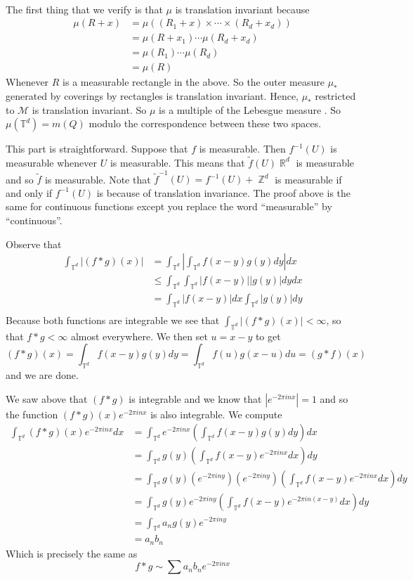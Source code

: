 \documentclass{article}
\DeclareMathOperator{\Z}{\mathbb{Z}}
\DeclareMathOperator{\R}{\mathbb{R}}
\newcommand{\problem}[1]{\noindent{\textbf{Problem #1}}\\}
\newcommand{\problempart}[1]{\noindent{\textbf{(#1)}}}
\begin{document}
\problem{6.7.16}
\problempart{a} The first thing that we verify is that $\mu$ is translation invariant because
\begin{align*}
\mu(R + x) &= \mu((R_1 + x) \times \cdots \times (R_d + x_d)) \\
&= \mu(R+x_1)\cdots\mu(R_d + x_d) \\
&= \mu(R_1)\cdots\mu(R_d) \\
&= \mu(R)
\end{align*}
Whenever $R$ is a measurable rectangle in the above. So the outer measure $\mu_*$ generated by coverings by rectangles is translation invariant. Hence, $\mu_*$ restricted to $\mathcal{M}$ is translation invariant. So $\mu$ is a multiple of the Lebesgue measure . So $\mu(\mathbb{T}^d) = m(Q)$ modulo the correspondence between these two spaces. 

\problempart{b} This part is straightforward. Suppose that $f$ is measurable. Then $f^{-1}(U)$ is measurable whenever $U$ is measurable. This means that $\tilde{f}(U) \R^d$ is measurable and so $\tilde{f}$ is measurable. Note that $\tilde{f}^{-1}(U) = f^{-1}(U) + \Z^d$ is measurable if and only if $f^{-1}(U)$ is because of translation invariance. The proof above is the same for continuous functions except you replace the word ``measurable'' by ``continuous''.  

\problempart{c} Observe that
\begin{align*}
\int_{\mathbb{T}^d} |(f * g)(x)| &= \int_{\mathbb{T}^d}\left|\int_{\mathbb{T}^d} f(x-y)g(y)dy\right|dx \\
&\leq \int_{\mathbb{T}^d}\int_{\mathbb{T}^d}|f(x-y)||g(y)|dydx \\ 
&= \int_{\mathbb{T}^d}|f(x-y)|dx\int_{\mathbb{T}^d}|g(y)|dy \\
\end{align*}
Because both functions are integrable we see that $\int_{\mathbb{T}^d} |(f * g)(x)| < \infty$, so that $f * g < \infty$ almost everywhere. We then set $u = x-y$ to get
\[
(f*g)(x) = \int_{\mathbb{T}^d} f(x-y)g(y)dy = \int_{\mathbb{T}^d} f(u)g(x-u)du = (g*f)(x)
\]
and we are done. 

\problempart{d} We saw above that $(f*g)$ is integrable and we know that $|e^{-2\pi inx}| = 1$ and so the function $(f*g)(x)e^{-2\pi inx}$ is also integrable. We  compute
\begin{align*}
\int_{\mathbb{T}^d} (f*g)(x)e^{-2\pi inx}dx &= \int_{\mathbb{T}^d} e^{-2\pi inx}\left(\int_{\mathbb{T}^d} f(x-y)g(y)dy\right)dx \\
&= \int_{\mathbb{T}^d} g(y) \left(\int_{\mathbb{T}^d} f(x-y)e^{-2\pi inx}dx\right)dy \\
&= \int_{\mathbb{T}^d} g(y) (e^{-2\pi iny})(e^{-2\pi iny})\left(\int_{\mathbb{T}^d} f(x-y)e^{-2\pi inx}dx\right)dy \\
&= \int_{\mathbb{T}^d} g(y)e^{-2\pi iny}\left(\int_{\mathbb{T}^d} f(x-y)e^{-2\pi in(x-y)}dx\right)dy \\
&= \int_{\mathbb{T}^d} a_ng(y)e^{-2\pi iny} \\
&= a_nb_n
\end{align*}
Which is precisely the same as
\[
f*g \sim \sum a_nb_n e^{-2\pi inx}
\]
\end{document}
